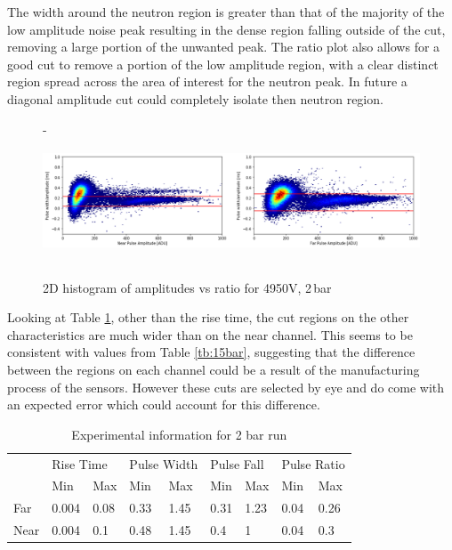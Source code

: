 \documentclass[a4paper]{article}
\begin{document}
\noindent The width around the neutron region is greater than that of the majority of the low amplitude noise peak resulting in the dense region falling outside of the cut, removing a large portion of the unwanted peak.
\newline The ratio plot also allows for a good cut to remove a portion of the low amplitude region, with a clear distinct region spread across the area of interest for the neutron peak. In future a diagonal amplitude cut could completely isolate then neutron region.
\begin{figure}[H]-
    \centering
    \includegraphics[height=3.7cm]{uk26n000_len.png}
    \caption{2D histogram of amplitudes vs ratio  for 4950V, 2\,bar}
    \label{fig:3len}
\end{figure}
\noindent Looking at Table \ref{tb:2bar}, other than the rise time, the cut regions on the other characteristics are much wider than on the near channel. This seems to be consistent with values from Table \ref{tb:15bar}, suggesting that the difference between the regions on each channel could be a result of the manufacturing process of the sensors. However these cuts are selected by eye and do come with an expected error which could account for this difference.
\begin{table}[H]
\centering
\caption{Experimental information for 2 bar run}
\label{tb:2bar}
\begin{tabular}{|l|ll|ll|ll|ll|} 
\cline{2-9}
\multicolumn{1}{l|}{} & \multicolumn{2}{l|}{Rise Time} & \multicolumn{2}{l|}{Pulse Width} & \multicolumn{2}{l|}{Pulse Fall} & \multicolumn{2}{l|}{Pulse Ratio}  \\ 
\cline{2-9}
\multicolumn{1}{l|}{} & \multicolumn{1}{l|}{Min} & Max                                   & \multicolumn{1}{l|}{Min} & Max                                     & \multicolumn{1}{l|}{Min} & Max                                    & \multicolumn{1}{l|}{Min} & Max                                                \\ 
\hline
Far                   & 0.004                    & 0.08                                  & 0.33                     & 1.45                                    & 0.31                     & 1.23                                   & 0.04                     & 0.26                                               \\ 
\hline
Near                  & 0.004                    & 0.1                                   & 0.48                     & 1.45                                    & 0.4                      & 1                                      & 0.04                     & 0.3                                                \\
\hline
\end{tabular}
\end{table}
\end{document}
